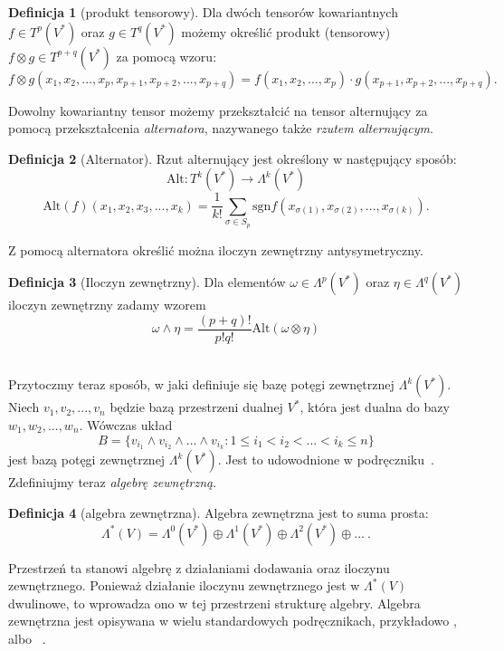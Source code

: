 \documentclass[licencjacka]{pracamgr}
\theoremstyle{definition}
\newtheorem{definition}{Definicja}[section]
\theoremstyle{definition}
\theoremstyle{plain}
\theoremstyle{plain}
\theoremstyle{plain}
\theoremstyle{plain}
\theoremstyle{plain}
\begin{document}
\begin{definition}[produkt tensorowy]
Dla dwóch tensorów kowariantnych $f \in T^p(V^\ast) $ oraz $g \in T^q(V^\ast) $
możemy określić produkt (tensorowy) $f \otimes g \in T^{p+q}(V^\ast) $ za
pomocą wzoru:
\[
  f \otimes g(x_1, x_2, ..., x_p, x_{p+1}, x_{p+2}, ... ,x_{p+q}) =
  f(x_1, x_2, ... , x_p) \cdot g(x_{p+1}, x_{p+2}, ... , x_{p+q}).
\] 
\end{definition}
Dowolny kowariantny tensor możemy
przekształcić na tensor alternujący za pomocą przekształcenia
\emph{alternatora}, nazywanego także \emph{rzutem alternującym}.


\begin{definition}[Alternator]
Rzut alternujący jest określony w następujący sposób:
\[
\text{Alt}:T^k (V^\ast) \rightarrow  \Lambda^k (V^\ast)
\]
\[
\text{Alt}(f)(x_1, x_2, x_3, ..., x_k) = \frac{1}{k!}
  \sum_{\sigma \in S_p}
     \text{sgn} f(x_{\sigma(1)}, x_{\sigma(2)}, ..., x_{\sigma(k)}).
\] 
\end{definition}

Z pomocą alternatora określić można iloczyn zewnętrzny antysymetryczny. 

\begin{definition}[Iloczyn zewnętrzny]
Dla elementów $\omega \in \Lambda^p (V^\ast)$ oraz 
$\eta \in \Lambda^q (V^\ast)$ iloczyn zewnętrzny zadamy wzorem
\[
  \omega \wedge \eta = \frac{(p+q)!}{p!q!} \text{Alt} (\omega \otimes \eta)
\] \\
\end{definition}

Przytoczmy teraz sposób, w jaki definiuje się bazę potęgi zewnętrznej
$\Lambda^k(V^\ast)$. Niech $v_1, v_2, ... , v_n$ będzie bazą przestrzeni dualnej
$V^\ast$, która jest dualna do bazy $w_1, w_2, ..., w_n$.
Wówczas układ
\[
  B = \{ v_{i_1} \wedge v_{i_2} \wedge ... \wedge v_{i_k} : 1 \leq i_1 < i_2 < ... <i_k \leq n \}
\]
jest bazą potęgi zewnętrznej $\Lambda^k(V^\ast)$. Jest to udowodnione w
podręczniku~\cite[Rozdział §3.2, Twierdzenie 3]{kostrikin}.
Zdefiniujmy teraz \emph{algebrę zewnętrzną}.

\begin{definition}[algebra zewnętrzna]
Algebra zewnętrzna jest to suma prosta:
\[
\Lambda^\ast (V) = 
\Lambda^0(V^\ast) \oplus
\Lambda^1(V^\ast) \oplus
\Lambda^2(V^\ast) \oplus
...~.
\]
\end{definition}
Przestrzeń ta stanowi algebrę z działaniami dodawania oraz iloczynu
zewnętrznego.  Ponieważ działanie iloczynu zewnętrznego jest w $\Lambda^\ast
(V)$ dwulinowe, to wprowadza ono w tej przestrzeni strukturę algebry.  Algebra
zewnętrzna jest opisywana w wielu standardowych podręcznikach, przykładowo
\cite[Rozdział 6§3.2]{kostrikin},  albo ~\cite[Proposition 14.11]{lee}. \\
\end{document}
